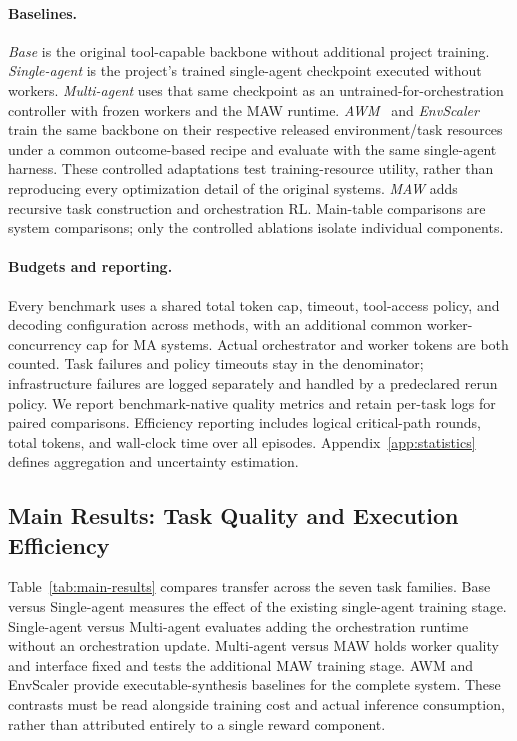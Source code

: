 \paragraph{Baselines.}
\emph{Base} is the original tool-capable backbone without additional project training. \emph{Single-agent} is the project's trained single-agent checkpoint executed without workers. \emph{Multi-agent} uses that same checkpoint as an untrained-for-orchestration controller with frozen workers and the MAW runtime. \emph{AWM}~\citep{wang2026agentworldmodelinfinity} and \emph{EnvScaler}~\citep{song2026envscaler} train the same backbone on their respective released environment/task resources under a common outcome-based recipe and evaluate with the same single-agent harness. These controlled adaptations test training-resource utility, rather than reproducing every optimization detail of the original systems. \emph{MAW} adds recursive task construction and orchestration RL. Main-table comparisons are system comparisons; only the controlled ablations isolate individual components.

\paragraph{Budgets and reporting.}
Every benchmark uses a shared total token cap, timeout, tool-access policy, and decoding configuration across methods, with an additional common worker-concurrency cap for MA systems. Actual orchestrator and worker tokens are both counted. Task failures and policy timeouts stay in the denominator; infrastructure failures are logged separately and handled by a predeclared rerun policy. We report benchmark-native quality metrics and retain per-task logs for paired comparisons. Efficiency reporting includes logical critical-path rounds, total tokens, and wall-clock time over all episodes. Appendix~\ref{app:statistics} defines aggregation and uncertainty estimation.



\subsection{Main Results: Task Quality and Execution Efficiency}

Table~\ref{tab:main-results} compares transfer across the seven task families. Base versus Single-agent measures the effect of the existing single-agent training stage. Single-agent versus Multi-agent evaluates adding the orchestration runtime without an orchestration update. Multi-agent versus MAW holds worker quality and interface fixed and tests the additional MAW training stage. AWM and EnvScaler provide executable-synthesis baselines for the complete system. These contrasts must be read alongside training cost and actual inference consumption, rather than attributed entirely to a single reward component.

